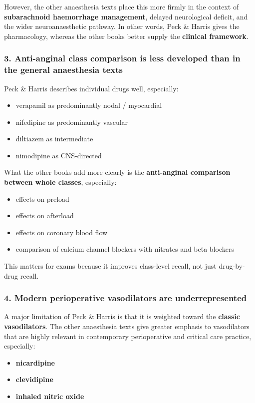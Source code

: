 \documentclass[11pt,a4paper]{article}
\begin{document}
However, the other anaesthesia texts place this more firmly in the context of \textbf{subarachnoid haemorrhage management}, delayed neurological deficit, and the wider neuroanaesthetic pathway. In other words, Peck \& Harris gives the pharmacology, whereas the other books better supply the \textbf{clinical framework}.

\subsubsection*{3. Anti-anginal class comparison is less developed than in the general anaesthesia texts}
Peck \& Harris describes individual drugs well, especially:
\begin{itemize}
    \item verapamil as predominantly nodal / myocardial
    \item nifedipine as predominantly vascular
    \item diltiazem as intermediate
    \item nimodipine as CNS-directed
\end{itemize}

What the other books add more clearly is the \textbf{anti-anginal comparison between whole classes}, especially:
\begin{itemize}
    \item effects on preload
    \item effects on afterload
    \item effects on coronary blood flow
    \item comparison of calcium channel blockers with nitrates and beta blockers
\end{itemize}

This matters for exams because it improves class-level recall, not just drug-by-drug recall.

\subsubsection*{4. Modern perioperative vasodilators are underrepresented}
A major limitation of Peck \& Harris is that it is weighted toward the \textbf{classic vasodilators}. The other anaesthesia texts give greater emphasis to vasodilators that are highly relevant in contemporary perioperative and critical care practice, especially:
\begin{itemize}
    \item \textbf{nicardipine}
    \item \textbf{clevidipine}
    \item \textbf{inhaled nitric oxide}
\end{itemize}
\end{document}
